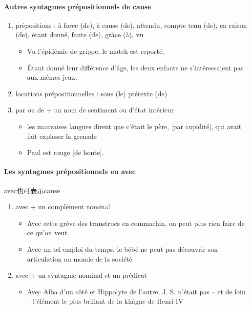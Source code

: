 \documentclass[UTF8]{report}
\begin{document}
\paragraph{Autres syntagmes prépositionnels de cause}
\begin{enumerate}
    \item prépositions : à force (de), à cause (de), attendu, compte tenu (de), en raison (de), étant donné, faute (de), grâce (à), vu
    \begin{itemize}
        \item Vu l’épidémie de grippe, le match est reporté.
        \item Étant donné leur différence d’âge, les deux enfants ne s’intéressaient pas aux mêmes jeux.
    \end{itemize}
    \item locutions prépositionnelles : sous (le) prétexte (de)
    \item par ou de + un nom de sentiment ou d’état intérieur
    \begin{itemize}
        \item les mauvaises langues dirent que c’était le père, [par cupidité], qui avait fait exploser la grenade
        \item Paul est rouge [de honte].
    \end{itemize}
\end{enumerate}

\paragraph{Les syntagmes prépositionnels en avec}
avec也可表示cause 
\begin{enumerate}
    \item avec + un complément nominal
    \begin{itemize}
        \item Avec cette grève des transtrucs en commachin, on peut plus rien faire de ce qu’on veut. 
        \item Avec un tel emploi du temps, le bébé ne peut pas découvrir son articulation au monde de la société
    \end{itemize}
    \item avec + un syntagme nominal et un prédicat
    \begin{itemize}
        \item Avec Alba d’un côté et Hippolyte de l’autre, J. S. n’était pas – et de loin – l’élément le plus brillant de la khâgne de Henri-IV 
    \end{itemize}
\end{enumerate}
\end{document}
